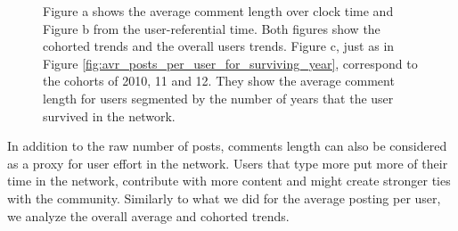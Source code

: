 \begin{figure}[!tb]
\begin{subfigure}{1\textwidth}
\caption{}\end{subfigure}
\caption{Figure a shows the average comment length over clock time and Figure b from the user-referential time. Both figures show the cohorted trends and the overall users trends. Figure c, just as in Figure \ref{fig:avr_posts_per_user_for_surviving_year}, correspond to the cohorts of 2010, 11 and 12. They show the average comment length for users segmented by the number of years that the user survived in the network.}
\label{fig:comment_length}
\end{figure}

In addition to the raw number of posts, comments length can also be considered as a proxy for user effort in the network. Users that type more put more of their time in the network, contribute with more content and might create stronger ties with the community. Similarly to what we did for the average posting per user, we analyze the overall average and cohorted trends.



